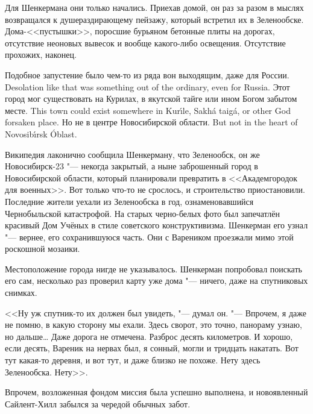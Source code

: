 Для Шенкермана они только начались.
Приехав домой, он раз за разом в мыслях возвращался к душераздирающему пейзажу, который встретил их в Зеленообске.
Дома-<<пустышки>>, поросшие бурьяном бетонные плиты на дорогах, отсутствие неоновых вывесок и вообще какого-либо освещения.
Отсутствие прохожих, наконец.

{Подобное запустение было чем-то из ряда вон выходящим, даже для России.}
{Desolation like that was something out of the ordinary, even for Russia.}
{Этот город мог существовать на Курилах, в якутской тайге или ином Богом забытом месте.}
{This town could exist somewhere in Kur\'{\i}le, Sakh\'a taig\'a, or other God forsaken place.}
{Но не в центре Новосибирской области.}
{But not in the heart of Novosib\'{\i}rsk \'Oblast.}

Википедия лаконично сообщила Шенкерману, что Зеленообск, он же Новосибирск-23 "--- некогда закрытый, а ныне заброшенный город в Новосибирской области, который планировали превратить в <<Академгородок для военных>>.
Вот только что-то не срослось, и строительство приостановили.
Последние жители уехали из Зеленообска в год, ознаменовавшийся Чернобыльской катастрофой.
На старых черно-белых фото был запечатлён красивый Дом Учёных в стиле советского конструктивизма.
Шенкерман его узнал "--- вернее, его сохранившуюся часть.
Они с Вареником проезжали мимо этой роскошной мозаики.

Местоположение города нигде не указывалось.
Шенкерман попробовал поискать его сам, несколько раз проверил карту уже дома "--- ничего, даже на спутниковых снимках.

<<Ну уж спутник-то их должен был увидеть, "--- думал он.
"--- Впрочем, я даже не помню, в какую сторону мы ехали.
Здесь сворот, это точно, панораму узнаю, но дальше\ldots{}
Даже дорога не отмечена.
Разброс десять километров.
И хорошо, если десять, Вареник на нервах был, я сонный, могли и тридцать накатать.
Вот тут какая-то деревня, и вот тут, и даже близко не похоже.
Нету здесь Зеленообска.
Нету>>.

Впрочем, возложенная фондом миссия была успешно выполнена, и новоявленный Сайлент-Хилл забылся за чередой обычных забот.

\chapter{}

\label{Sat_2012_06_02}

\textspace


